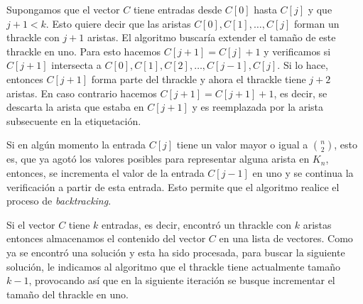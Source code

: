   Supongamos que el vector $C$ tiene entradas desde $C[0]$ hasta $C[j]$ y que
  $j+1 < k$. Esto quiere decir que las aristas $C[0],C[1],\dots,C[j]$ forman un
  thrackle con $j+1$ aristas. El algoritmo buscaría extender el tamaño de este
  thrackle en uno. Para esto hacemos $C[j+1]=C[j]+1$ y verificamos si $C[j+1]$
  intersecta a $C[0],C[1],C[2],\dots,C[j-1],C[j]$. Si lo hace, entonces
  $C[j+1]$ forma parte del thrackle y ahora el thrackle tiene $j+2$ aristas. En
  caso contrario hacemos $C[j+1]=C[j+1]+1$, es decir, se descarta la arista que
  estaba en $C[j+1]$ y es reemplazada por la arista subsecuente en la
  etiquetación.

  Si en algún momento la entrada $C[j]$ tiene un valor mayor o igual a
  $\binom{n}{2}$, esto es, que ya agotó los valores posibles para representar
  alguna arista en $K_n$, entonces, se incrementa el valor de la entrada
  $C[j-1]$ en uno y se continua la verificación a partir de esta entrada. Esto
  permite que el algoritmo realice el proceso de \emph{backtracking}.

  Si el vector $C$ tiene $k$ entradas, es decir, encontró un thrackle con $k$
  aristas entonces almacenamos el contenido del vector $C$ en una lista de
  vectores. Como ya se encontró una solución y esta ha sido procesada, para
  buscar la siguiente solución, le indicamos al algoritmo que el thrackle tiene
  actualmente tamaño $k-1$, provocando así que en la siguiente iteración se
  busque incrementar el tamaño del thrackle en uno.

